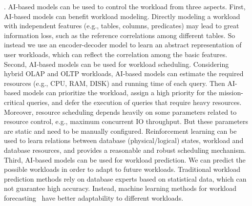 . AI-based models can be used to control the workload from three aspects. First, AI-based models can benefit workload modeling. Directly modeling a workload with independent features (e.g., tables, columns, predicates) may lead to great information loss, such as the reference correlations among different tables. So instead we use an encoder-decoder model to learn an abstract representation of user workloads, which can reflect the correlation among the basic features. Second, AI-based models can be used for workload scheduling. Considering hybrid OLAP and OLTP workloads, AI-based models can estimate the required resources (e.g., CPU, RAM, DISK) and running time of each query. Then AI-based models can prioritize the workload, assign a high priority for the mission-critical queries, and defer the execution of queries that require heavy resources. Moreover, resource scheduling depends heavily on some parameters related to resource control, e.g., maximum concurrent IO throughput. But these parameters are static and need to be manually configured. Reinforcement learning can be used to learn relations between database (physical/logical) states, workload and database resources, and provides a reasonable and robust scheduling mechanism. Third, AI-based models can be used for workload prediction. We can predict the possible workloads in order to adapt to future workloads. Traditional workload prediction methods rely on database experts based on statistical data, which can not guarantee high accuracy. Instead, machine learning methods for workload forecasting~\cite{DBLP:conf/sigmod/MaAHMPG18} have better adaptability to different workloads. 




